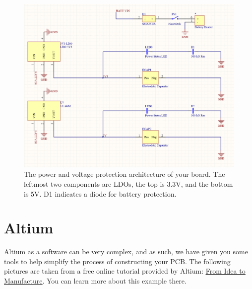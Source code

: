 \documentclass[12pt]{article}
\begin{document}
    \begin{figure}[h]
    \begin{center}
    \includegraphics[scale = .3]{Figures/Altium_pwr.PNG}
    \caption{The power and voltage protection architecture of your board. The leftmost two components are LDOs, the top is 3.3V, and the bottom is 5V. D1 indicates a diode for battery protection.}
    \end{center}
    \end{figure}
    
    \section*{Altium}
    Altium as a software can be very complex, and as such, we have given you some tools to help simplify the process of constructing your PCB. The following pictures are taken from a free online tutorial provided by Altium: \href{http://www.altium.com/documentation/18.0/display/ADES/From+Idea+to+Manufacture+-+Driving+a+PCB+Design+through+Altium+Designer}{\underline{From Idea to Manufacture}}. You can learn more about this example there.\\
    
\end{document}
